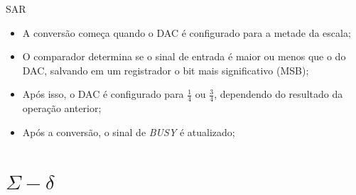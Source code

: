\documentclass{beamer}
\begin{document}

\begin{frame}{SAR}
	\begin{itemize}
		\item A conversão começa quando o DAC é configurado para a metade da escala;
		\item O comparador determina se o sinal de entrada é maior ou menos que o do DAC, salvando em um registrador o bit mais significativo (MSB);
		\item Após isso, o DAC é configurado para $\frac{1}{4}$ ou $\frac{3}{4}$, dependendo do resultado da operação anterior;
		\item Após a conversão, o sinal de \textit{BUSY} é atualizado;
	\end{itemize}
\end{frame}


\section{$\Sigma - \delta$}
\end{document}
